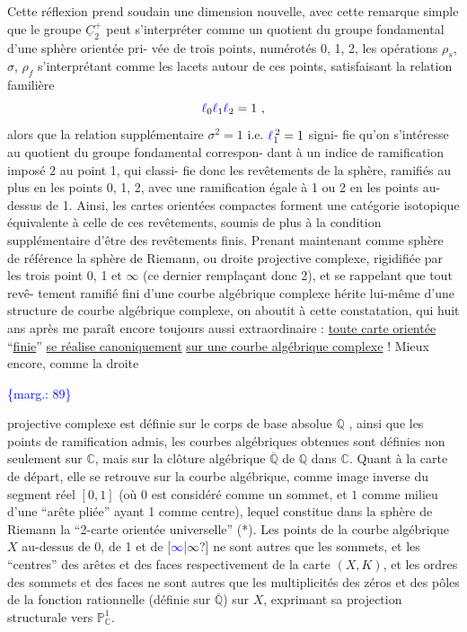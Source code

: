 \documentclass[11pt]{article}
\newcommand{\scanpage}[1]{\par\bigskip\noindent{\small\sffamily[scan #1]}\par}
\newcommand{\mspage}[1]{{\small\sffamily[p.\,#1]}}
\newcommand{\hand}[1]{\textcolor{blue}{#1}}
\newcommand{\margin}[1]{\textcolor{blue}{\{\textsf{marg.:} #1\}}}
\newcommand{\uline}[1]{\underline{#1}}
\newcommand{\unsure}[1]{[#1?]}
\begin{document}
Cette réflexion prend soudain une dimension nouvelle,
avec cette remarque simple que le groupe $\underline{C}_2^+$ peut s'interpréter
comme un quotient du groupe fondamental d'une sphère orientée pri-%
vée de trois points, numérotés 0, 1, 2, les opérations $\rho_s$, $\sigma$, $\rho_f$
s'interprétant comme les lacets autour de ces points, satisfaisant
la relation familière
\[ \hand{\ell}_0\hand{\ell}_1\hand{\ell}_2 = 1 \ , \]
alors que la relation supplémentaire $\sigma^2 = 1$ i.e. $\hand{\ell}_1^{\,2} = 1$ signi-%
fie qu'on s'intéresse au quotient du groupe fondamental correspon-%
dant à un indice de ramification imposé 2 au point 1, qui classi-%
fie donc les revêtements de la sphère, ramifiés au plus en les
points 0, 1, 2, avec une ramification égale à 1 ou 2 en les points
au-dessus de 1. Ainsi, les cartes orientées compactes forment une
catégorie isotopique équivalente à celle de ces revêtements, soumis
de plus à la condition supplémentaire d'être des revêtements finis.
Prenant maintenant comme sphère de référence la sphère de Riemann,
ou droite projective complexe, rigidifiée par les trois point 0, 1
et $\infty$ (ce dernier remplaçant donc 2), et se rappelant que tout revê-%
tement ramifié fini d'une courbe algébrique complexe hérite lui-même
d'une structure de courbe algébrique complexe, on aboutit à cette
constatation, qui huit ans après me paraît encore toujours aussi
extraordinaire : \uline{toute carte orientée} ``\uline{finie}'' \uline{se réalise canoniquement}
\uline{sur une courbe algébrique complexe} ! Mieux encore, comme la droite

\margin{89}

\clearpage
\scanpage{119/90}
\mspage{12}

projective complexe est définie sur le corps de base absolue $\mathbb{Q}$ ,
ainsi que les points de ramification admis, les courbes algébriques
obtenues sont définies non seulement sur $\mathbb{C}$, mais sur la clôture
algébrique $\overline{\mathbb{Q}}$ de $\mathbb{Q}$ dans $\mathbb{C}$. Quant à la carte de départ, elle se
retrouve sur la courbe algébrique, comme image inverse du segment
réel $[0,1]$ (où $0$ est considéré comme un sommet, et $1$ comme
milieu d'une ``arête pliée'' ayant 1 comme centre), lequel constitue
dans la sphère de Riemann la ``2-carte orientée universelle'' (*).
Les points de la courbe algébrique $X$ au-dessus de 0, de 1 et de \unsure{\hand{$\infty$}|$\infty$}
ne sont autres que les sommets, et les ``centres'' des arêtes et des
faces respectivement de la carte $(X,K)$, et les ordres des sommets
et des faces ne sont autres que les multiplicités des zéros et
des pôles de la fonction rationnelle (définie sur $\overline{\mathbb{Q}}$) sur $X$,
exprimant sa projection structurale vers $\mathbb{P}^1_{\mathbb{C}}$.
\end{document}
